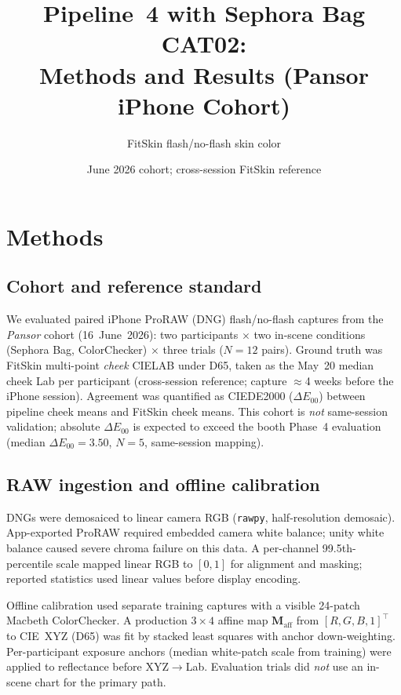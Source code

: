 \documentclass[11pt]{article}
\title{Pipeline~4 with Sephora Bag CAT02:\\
  Methods and Results (Pansor iPhone Cohort)}
\author{FitSkin flash/no-flash skin color}
\date{June 2026 cohort; cross-session FitSkin reference}
\newcommand{\deee}{\ensuremath{\Delta E_{00}}}
\begin{document}
\maketitle

\section{Methods}

\subsection{Cohort and reference standard}

We evaluated paired iPhone ProRAW (DNG) flash/no-flash captures from the \emph{Pansor} cohort (16~June~2026): two participants $\times$ two in-scene conditions (Sephora Bag, ColorChecker) $\times$ three trials ($N=12$ pairs). Ground truth was FitSkin multi-point \emph{cheek} CIELAB under D65, taken as the May~20 median cheek Lab per participant (cross-session reference; capture $\approx$4 weeks before the iPhone session). Agreement was quantified as CIEDE2000 ($\deee$) between pipeline cheek means and FitSkin cheek means. This cohort is \emph{not} same-session validation; absolute $\deee$ is expected to exceed the booth Phase~4 evaluation (median $\deee=3.50$, $N=5$, same-session mapping).

\subsection{RAW ingestion and offline calibration}

DNGs were demosaiced to linear camera RGB (\texttt{rawpy}, half-resolution demosaic). App-exported ProRAW required embedded camera white balance; unity white balance caused severe chroma failure on this data. A per-channel 99.5th-percentile scale mapped linear RGB to $[0,1]$ for alignment and masking; reported statistics used linear values before display encoding.

Offline calibration used separate training captures with a visible 24-patch Macbeth ColorChecker. A production $3\times4$ affine map $\mathbf{M}_{\mathrm{aff}}$ from $[R,G,B,1]^\top$ to CIE~XYZ (D65) was fit by stacked least squares with anchor down-weighting. Per-participant exposure anchors (median white-patch scale from training) were applied to reflectance before XYZ$\rightarrow$Lab. Evaluation trials did \emph{not} use an in-scene chart for the primary path.
\end{document}
